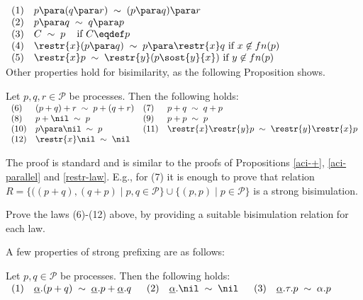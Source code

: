 $\begin{array}{llll}
(1) & p \para (q \para r) \; \sim \; (p \para q) \para r \\
(2) & p \para q\; \sim \; q \para p \\
(3) & C \; \sim \; p \; \; \; \mbox{ if $C \eqdef p$ }\\
(4) & \restr{x}(p \para q) \; \sim \;  p \para \restr{x}q \mbox{  if } x \not\in fn(p) \\
(5) & \restr{x}p \; \sim \;  \restr{y} (p\sost{y}{x}) \mbox{  if } y \not\in fn(p) \\
\end{array}$\\

Other properties hold for bisimilarity, as the following Proposition shows.

\begin{proposition}\label{prop2}
Let $p, q, r \in {\mathcal P}$ be processes. Then the following holds:\\

$\begin{array}{llll}
(6) & (p + q) + r \; \sim \; p + (q +r)  &
(7) & p + q\; \sim \; q + p  \\
(8) & p + \nil \; \sim \;  p  &
(9) & p + p \; \sim \; p \\
(10) & p \para \nil \; \sim \;  p &
(11) & \restr{x}\restr{y}p \; \sim \;  \restr{y}\restr{x}p\\
(12) & \restr{x} \nil \; \sim \; \nil &
\end{array}$

\proof 
The proof is standard and is similar to the proofs of Propositions \ref{aci-+}, \ref{aci-parallel} and \ref{restr-law}.
E.g., for (7) it is enough to prove that relation $R = \{ ((p+q),(q+p) \mid p,q \in   {\mathcal P} \} \cup 
\{ (p,p) \mid p \in  {\mathcal P} \} $ is a strong bisimulation. 
\fine
\end{proposition}

\begin{exercise}
Prove the laws (6)-(12) above, by providing a suitable bisimulation relation for each law.
\fine
\end{exercise}


A few properties of strong prefixing are as follows:

\begin{proposition}\label{prop}
Let $p, q \in {\mathcal P}$ be processes. Then the following holds:\\

$\begin{array}{lllllr}
(1) & \underline\alpha.(p + q)  \; \sim \;   \underline\alpha.p +  \underline\alpha.q & \; \;
(2) &  \underline\alpha.\nil  \; \sim \;   \nil & \; \;
(3) &  \underline\alpha.\tau.p   \; \sim \;  \alpha.p \\
\end{array}
$\\[-.8cm]

\fine
\end{proposition}

